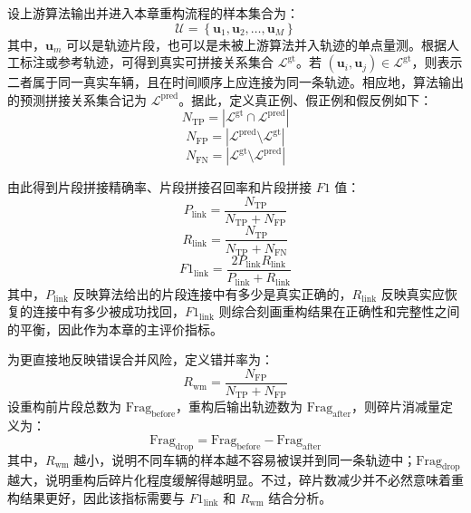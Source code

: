 \documentclass{xdupgthesis}
\begin{document}
设上游算法输出并进入本章重构流程的样本集合为：
\begin{equation}
	\mathcal{U}=\left\{\mathbf{u}_1,\mathbf{u}_2,\ldots,\mathbf{u}_M\right\}
\end{equation}
其中，$\mathbf{u}_m$ 可以是轨迹片段，也可以是未被上游算法并入轨迹的单点量测。根据人工标注或参考轨迹，可得到真实可拼接关系集合 $\mathcal{L}^{\mathrm{gt}}$。若 $\left(\mathbf{u}_i,\mathbf{u}_j\right)\in\mathcal{L}^{\mathrm{gt}}$，则表示二者属于同一真实车辆，且在时间顺序上应连接为同一条轨迹。相应地，算法输出的预测拼接关系集合记为 $\mathcal{L}^{\mathrm{pred}}$。据此，定义真正例、假正例和假反例如下：
\begin{equation}
	N_{\mathrm{TP}}=\left|\mathcal{L}^{\mathrm{gt}}\cap\mathcal{L}^{\mathrm{pred}}\right|
\end{equation}
\begin{equation}
	N_{\mathrm{FP}}=\left|\mathcal{L}^{\mathrm{pred}}\setminus\mathcal{L}^{\mathrm{gt}}\right|
\end{equation}
\begin{equation}
	N_{\mathrm{FN}}=\left|\mathcal{L}^{\mathrm{gt}}\setminus\mathcal{L}^{\mathrm{pred}}\right|
\end{equation}

由此得到片段拼接精确率、片段拼接召回率和片段拼接 $F1$ 值：
\begin{equation}
	P_{\mathrm{link}}
	=
	\frac{N_{\mathrm{TP}}}{N_{\mathrm{TP}}+N_{\mathrm{FP}}}
\end{equation}
\begin{equation}
	R_{\mathrm{link}}
	=
	\frac{N_{\mathrm{TP}}}{N_{\mathrm{TP}}+N_{\mathrm{FN}}}
\end{equation}
\begin{equation}
	F1_{\mathrm{link}}
	=
	\frac{2P_{\mathrm{link}}R_{\mathrm{link}}}{P_{\mathrm{link}}+R_{\mathrm{link}}}
\end{equation}
其中，$P_{\mathrm{link}}$ 反映算法给出的片段连接中有多少是真实正确的，$R_{\mathrm{link}}$ 反映真实应恢复的连接中有多少被成功找回，$F1_{\mathrm{link}}$ 则综合刻画重构结果在正确性和完整性之间的平衡，因此作为本章的主评价指标。

为更直接地反映错误合并风险，定义错并率为：
\begin{equation}
	R_{\mathrm{wm}}
	=
	\frac{N_{\mathrm{FP}}}{N_{\mathrm{TP}}+N_{\mathrm{FP}}}
\end{equation}
设重构前片段总数为 $\mathrm{Frag}_{\mathrm{before}}$，重构后输出轨迹数为 $\mathrm{Frag}_{\mathrm{after}}$，则碎片消减量定义为：
\begin{equation}
	\mathrm{Frag}_{\mathrm{drop}}
	=
	\mathrm{Frag}_{\mathrm{before}}-\mathrm{Frag}_{\mathrm{after}}
\end{equation}
其中，$R_{\mathrm{wm}}$ 越小，说明不同车辆的样本越不容易被误并到同一条轨迹中；$\mathrm{Frag}_{\mathrm{drop}}$ 越大，说明重构后碎片化程度缓解得越明显。不过，碎片数减少并不必然意味着重构结果更好，因此该指标需要与 $F1_{\mathrm{link}}$ 和 $R_{\mathrm{wm}}$ 结合分析。
\end{document}
